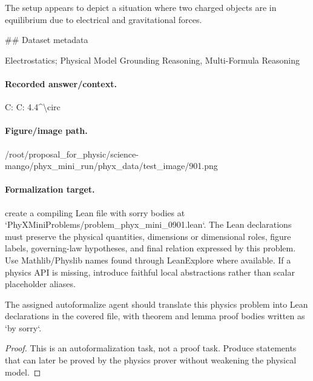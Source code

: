The setup appears to depict a situation where two charged objects are in equilibrium due to electrical and gravitational forces.

\#\# Dataset metadata

Electrostatics; Physical Model Grounding Reasoning, Multi-Formula Reasoning

\paragraph{Recorded answer/context.}
C: C: 4.4\textasciicircum{}\textbackslash{}circ

\paragraph{Figure/image path.}
/root/proposal\_for\_physic/science-mango/phyx\_mini\_run/phyx\_data/test\_image/901.png

\paragraph{Formalization target.}
create a compiling Lean file with sorry bodies at `PhyXMiniProblems/problem\_phyx\_mini\_0901.lean`. The Lean declarations must preserve the physical quantities, dimensions or dimensional roles, figure labels, governing-law hypotheses, and final relation expressed by this problem.
Use Mathlib/Physlib names found through LeanExplore where available. If a physics API is missing, introduce faithful local abstractions rather than scalar placeholder aliases.

\begin{theorem}
\label{thm:physics:phyx_mini_0901:target}
The assigned autoformalize agent should translate this physics problem into Lean declarations in the covered file, with theorem and lemma proof bodies written as `by sorry`.
\end{theorem}
\begin{proof}
This is an autoformalization task, not a proof task. Produce statements that can later be proved by the physics prover without weakening the physical model.
\end{proof}

